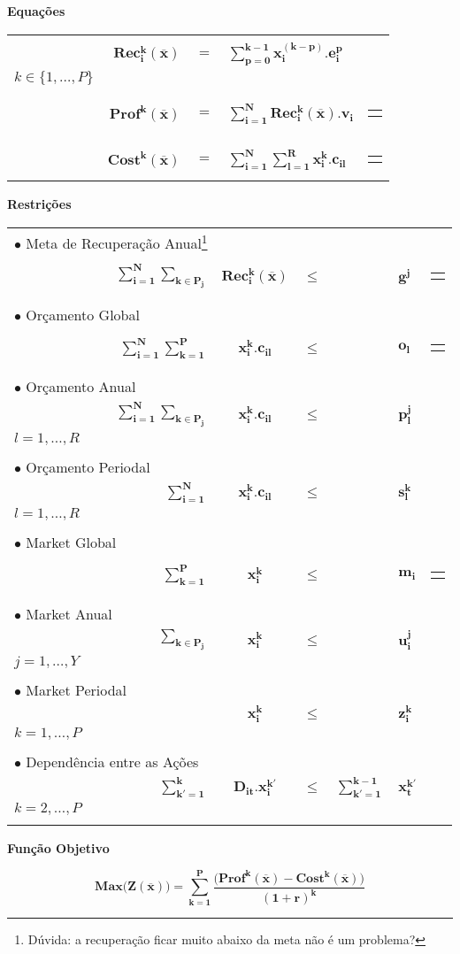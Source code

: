 \documentclass{article}
\newcommand{\topico}[1]{
  \vspace{20pt}
  {\Large \bf #1 }
}
\newenvironment{restricoes}
  { \begin{longtable}{lrcclll}}
  {\end{longtable} }
\newcommand{\restricao}[7]{
    \multicolumn{2}{l}{ $\bullet$ #1} & & \\ \nopagebreak
    & ${ \displaystyle \bm{#2} }$
    & ${ \bm{#3} }$
    & ${ \bm{#4} }$
    & ${ \displaystyle \bm{#5} }$
    & ${ \bm{#6} }$
	& \begin{tabular}{l}
	  #7
    \end{tabular}
	\\ \hspace{30pt}
}
\newenvironment{equacoes}
	{ \begin{longtable}{lrcll} }
	{ \end{longtable} }
\newcommand{\equacao}[4]{
    \multicolumn{5}{l}{\text{ \parbox{250pt}{$\bullet$ #1} }} \\   %
    \phantom{aaaaaa} & $ \displaystyle \bm{#2} $                              %
    & $ = $                 
	& $\displaystyle \bm{#3} $                           %
	&
	\begin{tabular}{l}
	  #4                                 %
	\end{tabular}
	\vspace{12pt}
	\\
}
\begin{document}
\topico{Equações}

\begin{equacoes}
    \equacao
	  {Recuperação de energia para o período $k$ causada pelas as ações $i$ de todos os períodos.}
	  {Rec_{i}^{k}(\overline{x})}
	  {\sum_{p = 0}^{k-1} x_i^{(k-p)} . e_i^{p}}
	  { $i \in \{1, \ldots, N\}$ \\ $k \in \{1, \ldots, P\}$ }
	\equacao
	  {Lucro originado pela energia recuperada no período $k$.}
	  {Prof^k(\overline{x})}
	  {\sum_{i=1}^N Rec_{i}^k(\overline{x}) . v_i}
	  { $k \in \{1, \ldots, P\}$}
	\equacao
	  {Custo total de todas as ações executadas no período $k$.}
	  {Cost^k(\overline{x})}
	  {\sum_{i=1}^N \sum_{l=1}^R x_i^k . c_{il}}
	  { $k \in \{1, \ldots, P\}$}
\end{equacoes}

\topico{Restrições}

\begin{restricoes}
    \restricao
	  {Meta de Recuperação Anual\footnote{Dúvida: a recuperação ficar muito abaixo da meta não é um problema?}}
	  { \sum_{i = 1}^N \sum_{k \in P_j}}
	  { Rec_i^k(\overline{x})}
	  { \leq }
	  { }
	  { g^j }
	  { $ j = 1, \ldots, Y $ }
	\\
    \restricao
	  {Orçamento Global}
	  { \sum_{i = 1}^N \sum_{k = 1}^P }
	  { x_i^k . c_{il}}
	  { \leq }
	  { }
	  { o_l }
	  { $ l = 1, \ldots, R $ }
	\\
    \restricao
      {Orçamento Anual}
      { \sum_{i = 1}^N \sum_{k \in P_j} }
      { x_i^k . c_{il} }
	  { \leq }
	  { }
	  { p_l^j }
	  { $ j = 1, \ldots, Y $ \\ $ l = 1, \ldots, R$ }
    \\
	\restricao
	  {Orçamento Periodal}
      { \sum_{i = 1}^N }
      { x_i^k . c_{il} }
	  { \leq }
	  { }
	  { s_l^{k} }
	  { $ k = 1, \ldots, P $ \\ $ l = 1, \ldots, R $ }
	\\
	\restricao
	  {Market Global}
      { \sum_{k = 1}^P }
      { x_i^k }
	  { \leq }
	  { }
	  { m_i }
	  { $ i = 1, \ldots, N $ }
	\\
	\restricao
	  {Market Anual}
      { \sum_{k \in P_j} }
      { x_i^k }
	  { \leq }
	  { }
	  { u_i^j }
	  { $ i = 1, \ldots, N $ \\ $ j = 1, \ldots, Y $ }
	\\
	\restricao
	  {Market Periodal}
      { }
      { x_i^k }
	  { \leq }
	  { }
	  { z_i^k }
	  { $ i = 1, \ldots, N $ \\ $ k = 1, \ldots, P$ }
	\\
	\restricao
	  {Dependência entre as Ações}
      { \sum_{k' = 1}^k }
      { D_{it} . x_i^{k'} }
	  { \leq }
	  { \sum_{k' = 1 }^{k-1} }
	  { x_t^{k'} }
	  { $i,t=1,\ldots,N$ \\ $k=2,\ldots,P$ }
\end{restricoes}

\topico{Função Objetivo}
\begin{equation}
  \nonumber
    \bm{
	  Max \big(Z(\overline{x})\big) =
	    \sum_{k=1}^P
	    \frac
		  {\big( Prof^k(\overline{x}) - Cost^k(\overline{x}) \big)}
	      {(1+r)^k}
	}
  \label{eq:budget}
\end{equation}

\vfill
\end{document}
